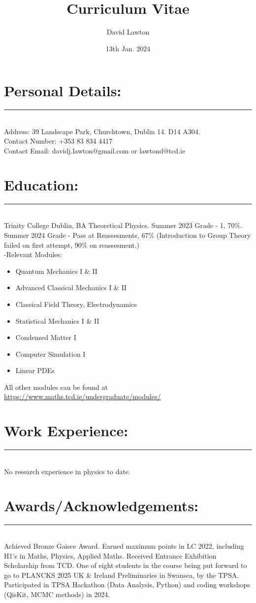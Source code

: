 \documentclass{article}
\title{Curriculum Vitae}
\author{David Lawton}
\date{13th Jan. 2024}
\begin{document}
\maketitle
\vfill

\section*{Personal Details:}
\hrule~\\
Address: 39 Landscape Park, Churchtown, Dublin 14. D14 A304.\\
Contact Number: +353 83 834 4417\\
Contact Email: davidj.lawton@gmail.com or lawtond@tcd.ie\\

\section*{Education:}
\hrule~\\
Trinity College Dublin, BA Theoretical Physics. Summer 2023 Grade - 1, 70\%. Summer 2024 Grade - Pass at Reassesments, 67\% (Introduction to Group Theory failed on first attempt, 90\% on reassesment.)\\
-Relevant Modules:
\begin{itemize}
\item Quantum Mechanics I \& II
\item Advanced Classical Mechanics I \& II
\item Classical Field Theory, Electrodynamics
\item Statistical Mechanics I \& II
\item Condensed Matter I
\item Computer Simulation I
\item Linear PDEs
\end{itemize}
All other modules can be found at \url{https://www.maths.tcd.ie/undergraduate/modules/}

\section*{Work Experience:}
\hrule~\\
No research experience in physics to date. 
\section*{Awards/Acknowledgements:}
\hrule~\\
Achieved Bronze Gaisce Award.  Earned maximum points in LC 2022, including H1's in Maths, Physics, Applied Maths.  Received Entrance Exhibition Scholarship from TCD.  One of eight students in the course being put forward to go to PLANCKS 2025 UK \& Ireland Preliminaries in Swansea, by the TPSA.  Participated in TPSA Hackathon (Data Analysis, Python) and coding workshops (QisKit, MCMC methods) in 2024.
\end{document}
